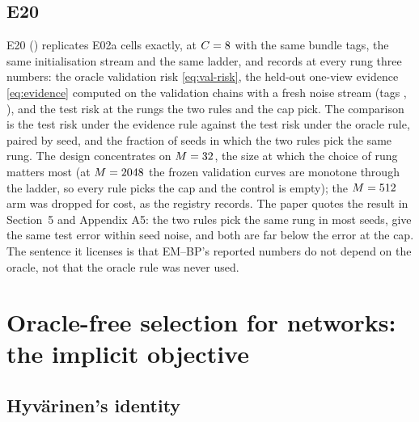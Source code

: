 \subsection{E20}

E20 () replicates E02a cells exactly, at
$C=8$ with the same bundle tags, the same initialisation stream and the same ladder,
and records at every rung three numbers: the oracle validation risk
\cref{eq:val-risk}, the held-out one-view evidence \cref{eq:evidence} computed on the
validation chains with a fresh noise stream (tags , ),
and the test risk at the rungs the two rules and the cap pick. The comparison is the
test risk under the evidence rule against the test risk under the oracle rule, paired
by seed, and the fraction of seeds in which the two rules pick the same rung. The design
concentrates on $M=32$, the size at which the choice of rung matters most (at
$M=2048$ the frozen validation curves are monotone through the ladder, so every rule
picks the cap and the control is empty); the $M=512$ arm was dropped for cost, as
the registry records. The paper quotes the result in Section~5 and Appendix A5: the two
rules pick the same rung in most seeds, give the same test error within seed noise,
and both are far below the error at the cap. The sentence it licenses is that EM--BP's
reported numbers do not depend on the oracle, not that the oracle rule was never used.

\section{Oracle-free selection for networks: the implicit objective}
\label{sec:ism-selection}

\subsection{Hyv\"arinen's identity}

